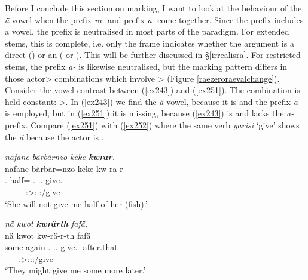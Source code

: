 Before I conclude this section on  marking, I want to look at the behaviour of the \emph{ä} vowel when the  prefix \emph{ra-} and  prefix \emph{a-} come together. Since the  prefix includes a vowel, the  prefix is neutralised in most parts of the paradigm. For extended stems, this  is complete, i.e. only the  frame indicates whether the  argument is a direct  (\Abs) or an  ({\Dat} or {\Poss}). This will be further discussed in {\S}\ref{irrealisra}. For restricted stems, the  prefix \emph{a-} is likewise neutralised, but the  marking pattern differs in those actor> combinations which involve \Sg>{\Sg} (Figure \ref{raezeroraevalchange}). Consider the vowel contrast between (\ref{ex243}) and (\ref{ex251}). The  combination is held constant: \Tsg>\Fsg{}. In (\ref{ex243}) we find the \emph{ä} vowel, because it is  and the  prefix \emph{a-} is employed, but in (\ref{ex251}) it is missing, because (\ref{ex243}) is  and lacks the \emph{a-} prefix. Compare (\ref{ex251}) with (\ref{ex252}) where the same verb \emph{yarisi} `give' shows the \emph{ä} because the actor  is .

\begin{exe}
	\ex \emph{nafane bärbärnzo keke \textbf{kwrar}.}\\
	\glll nafane {bärbär=nzo} keke kw-ra-r-\Zero\\
	\Tsg.{\Poss} {half=\Only} {\Neg} \Fsg.\Bet{}-\Irr.\Ndu.\Vc-give.\Rs-\Stsg\\
	~ ~ ~ {\footnotesize \Stsg:\Sbj>\Fsg:\Io:\Irr:\Pfv/give}\\
	\trans `She will not give me half of her (fish).' 
	\label{ex251}
\end{exe}
\begin{exe}
	\ex \emph{nä kwot \textbf{kwrärth} fafä.}\\
	\glll nä kwot kw-rä-r-th fafä\\
	some again \Fsg.\Bet-\Irr.\Pl.\Vc-give.\Rs-\Stnsg{} after.that\\
	~ ~ {\footnotesize \Stpl:\Sbj>\Fsg:\Io:\Irr:\Pfv/give} ~\\
	\trans `They might give me some more later.' 
	\label{ex252}
\end{exe}

